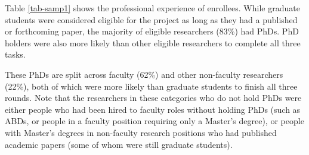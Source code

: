 \documentclass[
  letterpaper,
  DIV=11,
  numbers=noendperiod]{scrartcl}
\begin{document}
\begin{table}[!htbp] \centering \renewcommand*{\arraystretch}{1.1}\caption{Researcher Recruitment Source and Completion Confidence}\label{tab-samp1}
\end{table}

Table \ref{tab-samp1} shows the professional experience of enrollees.
While graduate students were considered eligible for the project as long
as they had a published or forthcoming paper, the majority of eligible
researchers (83\%) had PhDs. PhD holders were also more likely than
other eligible researchers to complete all three tasks.

These PhDs are split across faculty (62\%) and other non-faculty
researchers (22\%), both of which were more likely than graduate
students to finish all three rounds. Note that the researchers in these
categories who do not hold PhDs were either people who had been hired to
faculty roles without holding PhDs (such as ABDs, or people in a faculty
position requiring only a Master's degree), or people with Master's
degrees in non-faculty research positions who had published academic
papers (some of whom were still graduate students).
\end{document}
